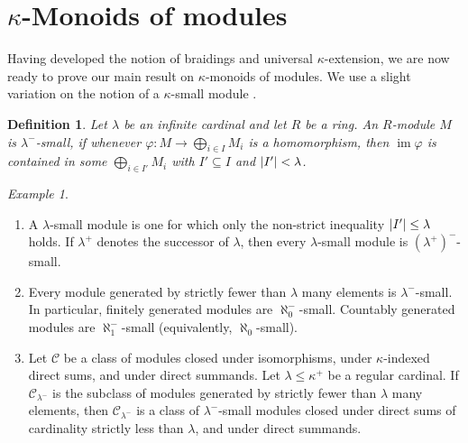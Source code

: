 \documentclass[a4paper,11pt,oneside]{amsart}
\newtheorem{defi}[teor]{Definition}
\theoremstyle{remark}
\newtheorem{example}[teor]{Example}
\DeclareMathOperator{\im}{im}
\DeclarePairedDelimiter{\card}{\lvert}{\rvert}
\newcommand{\defit}[1]{\textsf{#1}}
\newcommand{\cC}{\mathcal C}
\begin{document}
\section{\texorpdfstring{$\kappa$}{κ}-Monoids of modules} \label{sec:modules}

Having developed the notion of braidings and universal $\kappa$-extension, we are now ready to prove our main result on $\kappa$-monoids of modules.
We use a slight variation on the notion of a $\kappa$-small module \cite[Chapters 2.9 and 2.10]{Facchini98}.

\begin{defi}
  Let $\lambda$ be an infinite cardinal and let $R$ be a ring.
  An $R$-module $M$ is \defit{$\lambda^-$-small}, if whenever $\varphi\colon M \to \bigoplus_{i \in I} M_i$ is a homomorphism, then $\im \varphi$ is contained in some $\bigoplus_{i \in I'} M_i$ with $I' \subseteq I$ and $\card{I'} < \lambda$.
\end{defi}

\begin{example}
  \begin{enumerate}
  \item A $\lambda$-small module is one for which only the non-strict inequality $\card{I'} \le \lambda$ holds.
    If $\lambda^+$ denotes the successor of $\lambda$, then every $\lambda$-small module is $(\lambda^+)^-$-small.
    
  \item
    Every module generated by strictly fewer than $\lambda$ many elements is $\lambda^-$-small.
    In particular, finitely generated modules are $\aleph_0^-$-small.
    Countably generated modules are $\aleph_1^{-}$-small (equivalently, $\aleph_0$-small).

  \item Let $\cC$ be a class of modules closed under isomorphisms, under $\kappa$-indexed direct sums, and under direct summands.
    Let $\lambda \le \kappa^+$ be a regular cardinal.
    If $\cC_{\lambda^-}$ is the subclass of modules generated by strictly fewer than $\lambda$ many elements, then $\cC_{\lambda^-}$ is a class of $\lambda^-$-small modules closed under direct sums of cardinality strictly less than $\lambda$, and under direct summands.
  \end{enumerate}
\end{example}
\end{document}
